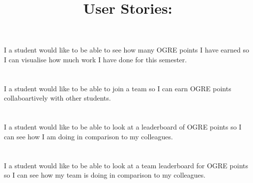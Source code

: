 \documentclass{article}
\begin{document}
\title{User Stories:}


\section{}
I a student would like to be able to see how many OGRE points I have earned so I can visualise how much work I have done for this semester.

\section{}
I a student would like to be able to join a team so I can earn OGRE points collaboartively with other students.

\section{}
I a student would like to be able to look at a leaderboard of OGRE points so I can see how I am doing in comparison to my colleagues.


\section{}
I a student would like to be able to look at a team leaderboard for OGRE points so I can see how my team is doing in comparison to my colleagues.
\end{document}

